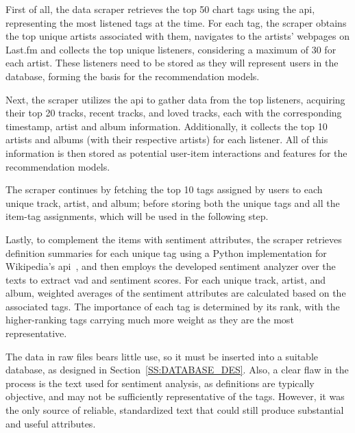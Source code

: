 \begin{compactenum}[\bfseries 1.]

    \item First of all, the data scraper retrieves the top 50 chart tags using the \acs{api}, representing the most listened tags at the time. For each tag, the scraper obtains the top unique artists associated with them, navigates to the artists' webpages on Last.fm and collects the top unique listeners, considering a maximum of 30 for each artist. These listeners need to be stored as they will represent users in the database, forming the basis for the recommendation models.
    \item Next, the scraper utilizes the \acs{api} to gather data from the top listeners, acquiring their top 20 tracks, recent tracks, and loved tracks, each with the corresponding timestamp, artist and album information. Additionally, it collects the top 10 artists and albums (with their respective artists) for each listener. All of this information is then stored as potential user-item interactions and features for the recommendation models.
    \item The scraper continues by fetching the top 10 tags assigned by users to each unique track, artist, and album; before storing both the unique tags and all the item-tag assignments, which will be used in the following step.
    \item Lastly, to complement the items with sentiment attributes, the scraper retrieves definition summaries for each unique tag using a Python implementation for Wikipedia's \acs{api}~\cite{WIKIPEDIA}, and then employs the developed sentiment analyzer over the texts to extract \acs{vad} and sentiment scores. For each unique track, artist, and album, weighted averages of the sentiment attributes are calculated based on the associated tags. The importance of each tag is determined by its rank, with the higher-ranking tags carrying much more weight as they are the most representative.

\end{compactenum}

The data in raw files bears little use, so it must be inserted into a suitable database, as designed in Section~\ref{SS:DATABASE_DES}. Also, a clear flaw in the process is the text used for sentiment analysis, as definitions are typically objective, and may not be sufficiently representative of the tags. However, it was the only source of reliable, standardized text that could still produce substantial and useful attributes.


